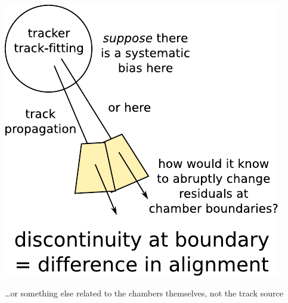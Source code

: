 \documentclass[compress]{beamer}
\begin{document}
\begin{frame}
\begin{center}
\includegraphics[width=0.6\linewidth]{argument.pdf}
\end{center}

\large \ldots or something else related to the chambers themselves, not the track source
\end{frame}
\end{document}
